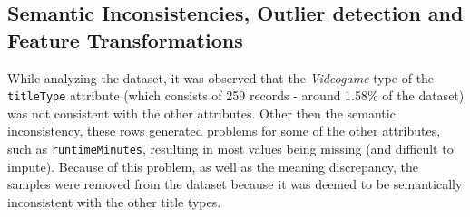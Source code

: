 \subsection{Semantic Inconsistencies, Outlier detection and Feature Transformations}
While analyzing the dataset, it was observed that the \textit{Videogame} type of the \texttt{titleType} attribute (which consists of 259
records - around 1.58\% of the dataset) was not consistent with the other attributes. 
Other then the semantic inconsistency, these rows
generated problems for some of the other attributes, such as \texttt{runtimeMinutes}, resulting in most
values being missing (and difficult to impute). Because of this problem, as well as the meaning discrepancy, the samples were removed from the dataset because it was deemed to be semantically inconsistent with the other title types.\\




